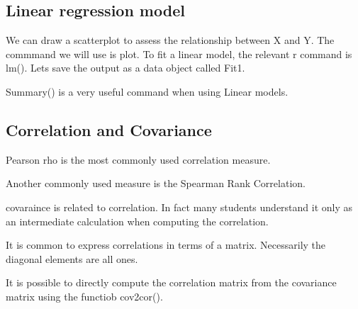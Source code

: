 \subsection*{Linear regression model}

We can draw a scatterplot to assess the relationship between X and Y.
The commmand we will use is plot.
To fit a linear model,
the relevant r command is lm().
Lets save the output as a data object called Fit1.

Summary()  
is a very useful command when using Linear models.
\subsection{Correlation and Covariance}

Pearson rho is the most commonly used correlation measure.

Another commonly used measure is the Spearman Rank Correlation. 

covaraince is related to correlation. In fact many students understand it only as an intermediate calculation when computing the correlation.

It is common to express correlations in terms of a matrix. Necessarily the diagonal elements are all ones.

It is possible to directly compute the correlation matrix from the covariance matrix using the functiob cov2cor().


